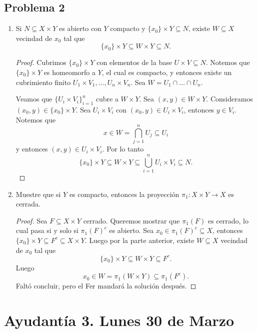 \documentclass{article}
\theoremstyle{definition}
\theoremstyle{remark}
\numberwithin{equation}{section}
\begin{document}
\newpage
\subsection{Problema 2}

\begin{enumerate}
  \item Si $N \subseteq X \times Y$ es abierto con $Y$ compacto y $\{x_0\} \times Y \subseteq N$, existe $W \subseteq X$ vecindad de $x_0$ tal que $$\{x_0\} \times Y \subseteq W \times Y \subseteq N.$$
  \begin{proof}
    Cubrimos $\{x_0\} \times Y$ con elementos de la base $U \times V \subseteq N$. Notemos que $\{x_0\} \times Y$ es homeomorfo a $Y$, el cual es compacto, y entonces existe un cubrimiento finito $U_1 \times V_1, \dots, U_n \times V_n$.
    Sea $W = U_1 \cap \dots \cap U_n$.
    
    Veamos que $\{U_i \times V_i\}_{i=1}^n$ cubre a $W \times Y$.
    Sea $(x,y) \in W \times Y$. Consideramos $(x_0,y) \in \{x_0\} \times Y$. Sea $U_i \times V_i$ con $(x_0,y) \in U_i \times V_i$, entonces $y \in V_i$. Notemos que
    \[x \in W = \bigcap_{j=1}^n U_j \subseteq U_i\]
    y entonces $(x,y) \in U_i \times V_i$. Por lo tanto
    \[\{x_0\} \times Y \subseteq W \times Y \subseteq \bigcup_{i=1}^n U_i \times V_i \subseteq N.\]
  \end{proof}
  
  \item Muestre que si $Y$ es compacto, entonces la proyección $\pi_1 \colon X \times Y \to X$ es cerrada.
  \begin{proof}
    Sea $F \subseteq X \times Y$ cerrado. Queremos mostrar que $\pi_1(F)$ es cerrado, lo cual pasa si y solo si $\pi_1(F)^c$ es abierto. Sea $x_0 \in \pi_1(F)^c \subseteq X$, entonces $\{x_0\} \times Y \subseteq F^c \subseteq X \times Y$.
    Luego por la parte anterior, existe $W \subseteq X$ vecindad de $x_0$ tal que $$\{x_0\} \times Y \subseteq W \times Y \subseteq F^c.$$
    Luego
    \[x_0 \in W = \pi_1(W \times Y) \subseteq \pi_1(F^c).\]
    Faltó concluir, pero el Fer mandará la solución después.
  \end{proof}
\end{enumerate}

\newpage
\section{Ayudantía 3. Lunes 30 de Marzo}
\end{document}
